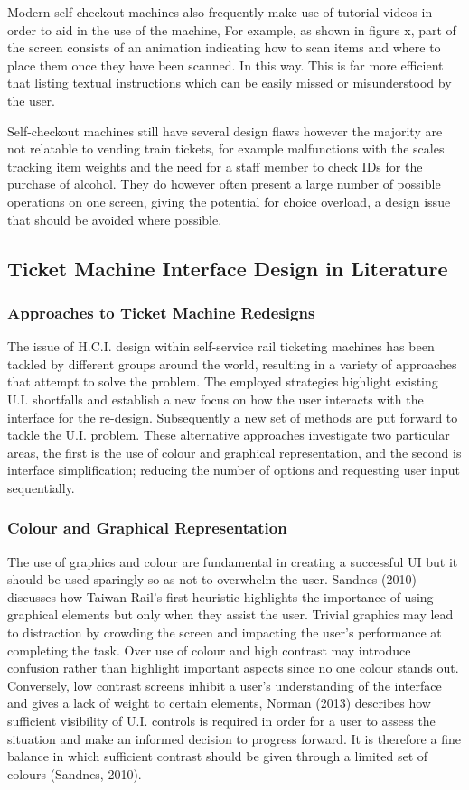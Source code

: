 Modern self checkout machines also frequently make use of tutorial videos in order to aid in the use of the machine, For example, as shown in figure x, part of the screen consists of an animation indicating how to scan items and where to place them once they have been scanned. In this way. This is far more efficient that listing textual instructions which can be easily missed or misunderstood by the user. 

Self-checkout machines still have several design flaws however the majority are not relatable to vending train tickets, for example malfunctions with the scales tracking item weights and the need for a staff member to check IDs for the purchase of alcohol. They do however often present a large number of possible operations on one screen, giving the potential for choice overload, a design issue that should be avoided where possible.

\subsection{Ticket Machine Interface Design in Literature}

\subsubsection{Approaches to Ticket Machine Redesigns}
The issue of H.C.I. design within self-service rail ticketing machines has been tackled by different groups around the world, resulting in a variety of approaches that attempt to solve the problem. The employed strategies highlight existing U.I. shortfalls and establish a new focus on how the user interacts with the interface for the re-design. Subsequently a new set of methods are put forward to tackle the U.I. problem. These alternative approaches investigate two particular areas, the first is the use of colour and graphical representation, and the second is interface simplification; reducing the number of options and requesting user input sequentially.


\subsubsection{Colour and Graphical Representation}
The use of graphics and colour are fundamental in creating a successful UI but it should be used sparingly so as not to overwhelm the user. Sandnes (2010) discusses how Taiwan Rail’s first heuristic highlights the importance of using graphical elements but only when they assist the user. Trivial graphics may lead to distraction by crowding the screen and impacting the user’s performance at completing the task. Over use of colour and high contrast may introduce confusion rather than highlight important aspects since no one colour stands out. Conversely, low contrast screens inhibit a user’s understanding of the interface and gives a lack of weight to certain elements,  Norman (2013) describes how sufficient visibility of U.I. controls is required in order for a user to assess the situation and make an informed decision to progress forward. It is therefore a fine balance in which sufficient contrast should be given through a limited set of colours (Sandnes, 2010). 

